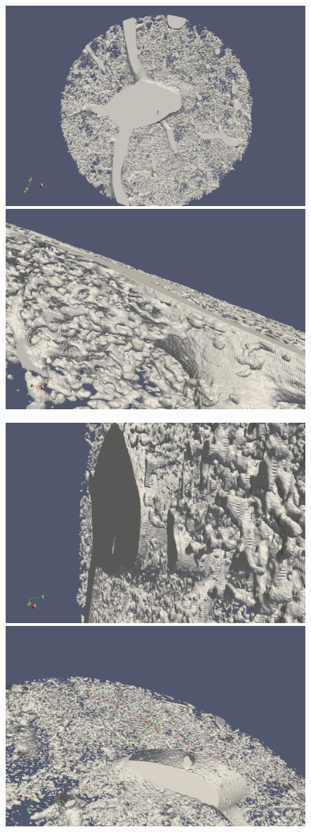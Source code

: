 \begin{figure}[htb] %
   \centering
   \includegraphics[width=0.49\linewidth]{images/LiverModel0.png}\hfill
   \includegraphics[width=0.49\linewidth]{images/LiverModel1.png}\newline
   
   \includegraphics[width=0.49\linewidth]{images/LiverModel2.png}\hfill
   \includegraphics[width=0.49\linewidth]{images/LiverModel3.png}\newline
   

\end{figure}
